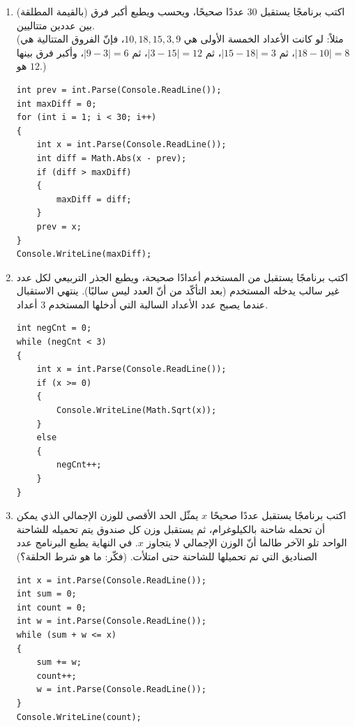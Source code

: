 \documentclass[14pt]{extarticle}
\begin{document}
\begin{enumerate}[resume, itemsep=2em]
\item اكتب برنامجًا يستقبل $30$ عددًا صحيحًا، ويحسب ويطبع أكبر فرق (بالقيمة المطلقة) بين عددين متتاليين. \\
(مثلاً: لو كانت الأعداد الخمسة الأولى هي $10, 18, 15, 3, 9$، فإنّ الفروق المتتالية هي $|18 - 10| = 8$، ثم $|15 - 18| = 3$، ثم $|3 - 15| = 12$، ثم $|9 - 3| = 6$، وأكبر فرق بينها هو $12$.)
\ifwithsols
\begin{boxSolution}
\begin{english}
\begin{verbatim}
int prev = int.Parse(Console.ReadLine());
int maxDiff = 0;
for (int i = 1; i < 30; i++)
{
    int x = int.Parse(Console.ReadLine());
    int diff = Math.Abs(x - prev);
    if (diff > maxDiff)
    {
        maxDiff = diff;
    }
    prev = x;
}
Console.WriteLine(maxDiff);
\end{verbatim}
\end{english}
\end{boxSolution}
\fi
\filbreak

\item اكتب برنامجًا يستقبل من المستخدم أعدادًا صحيحة، ويطبع الجذر التربيعي لكل عدد غير سالب يدخله المستخدم (بعد التأكّد من أنّ العدد ليس سالبًا). ينتهي الاستقبال عندما يصبح عدد الأعداد السالبة التي أدخلها المستخدم $3$ أعداد.
\ifwithsols
\begin{boxSolution}
\begin{english}
\begin{verbatim}
int negCnt = 0;
while (negCnt < 3)
{
    int x = int.Parse(Console.ReadLine());
    if (x >= 0)
    {
        Console.WriteLine(Math.Sqrt(x));
    }
    else
    {
        negCnt++;
    }
}
\end{verbatim}
\end{english}
\end{boxSolution}
\fi
\filbreak

\item اكتب برنامجًا يستقبل عددًا صحيحًا $x$ يمثّل الحد الأقصى للوزن الإجمالي الذي يمكن أن تحمله شاحنة بالكيلوغرام، ثم يستقبل وزن كل صندوق يتم تحميله للشاحنة الواحد تلو الآخر طالما أنّ الوزن الإجمالي لا يتجاوز $x$. في النهاية يطبع البرنامج عدد الصناديق التي تم تحميلها للشاحنة حتى امتلأت. (فكّر: ما هو شرط الحلقة؟)
\ifwithsols
\begin{boxSolution}
\begin{english}
\begin{verbatim}
int x = int.Parse(Console.ReadLine());
int sum = 0;
int count = 0;
int w = int.Parse(Console.ReadLine());
while (sum + w <= x)
{
    sum += w;
    count++;
    w = int.Parse(Console.ReadLine());
}
Console.WriteLine(count);
\end{verbatim}
\end{english}
\end{boxSolution}
\fi
\filbreak


\end{enumerate}
\end{document}
